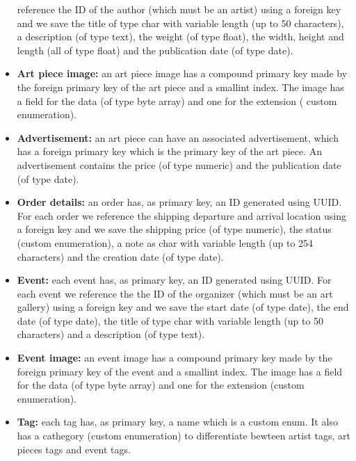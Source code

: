 \begin{itemize}
    reference the ID of the author (which must be an artist) using a foreign key and we save the title of type char
    with variable length (up to 50 characters), a description (of type text), the weight (of type float), the width, 
    height and length (all of type float) and the publication date (of type date).
    \item \textbf{Art piece image:} an art piece image has a compound primary key made by the foreign primary key of the art 
    piece and a smallint index. The image has a field for the data (of type byte array) and one for the extension (
    custom enumeration).
    \item \textbf{Advertisement:} an art piece can have an associated advertisement, which has a foreign primary key which 
    is the primary key of the art piece. An advertisement contains the price (of type numeric) and the publication
    date (of type date).
    \item \textbf{Order details:} an order has, as primary key, an ID generated using UUID. For each order we reference the 
    shipping departure and arrival location using a foreign key and we save the shipping price (of type numeric), the 
    status (custom enumeration), a note as char with variable length (up to 254 characters) and the creation date (of 
    type date).
    \item \textbf{Event:} each event has, as primary key, an ID generated using UUID. For each event we reference the 
    the ID of the organizer (which must be an art gallery) using a foreign key and we save the start date (of type
    date), the end date (of type date), the title of type char with variable length (up to 50 characters) and a 
    description (of type text).
    \item \textbf{Event image:} an event image has a compound primary key made by the foreign primary key of the event and a 
    smallint index. The image has a field for the data (of type byte array) and one for the extension (custom 
    enumeration).
    \item \textbf{Tag:} each tag has, as primary key, a name which is a custom enum. It also has a cathegory (custom enumeration)
     to differentiate bewteen artist tags, art pieces tags and event tags.
\end{itemize}